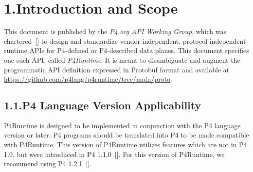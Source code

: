 \documentclass[11pt]{article}
\begin{document}
{\begin{mdtoc}
\begin{mdtocblock}


\end{mdtocblock}%
\end{mdtoc}%

\section{1.\hspace*{0.5em}Introduction and Scope}\label{sec-introduction-and-scope}%

\noindent{}This document is published by the \emph{P4.org API Working Group}, which was
chartered~[] to design and standardize vendor-independent,
protocol-independent runtime APIs for P4-defined or P4-described data
planes. This document specifies one such API, called \emph{P4Runtime}. It is meant to
disambiguate and augment the programmatic API definition expressed in Protobuf
format and available at
\href{https://github.com/p4lang/p4runtime/tree/main/proto}{https://github.com/p4lang/p4runtime/tree/main/proto}.%

\subsection{1.1.\hspace*{0.5em}P4 Language Version Applicability}\label{sec-p4-language-version-applicability}%

\noindent{}P4Runtime is designed to be implemented in conjunction with the P4 language
version or later. P4 programs should be translated into P4 to be made
compatible with P4Runtime. This version of P4Runtime utilizes features which are
not in P4 1.0, but were introduced in P4 1.1.0~[]. For
this version of P4Runtime, we recommend using P4 1.2.1~[].%

}
\end{document}
